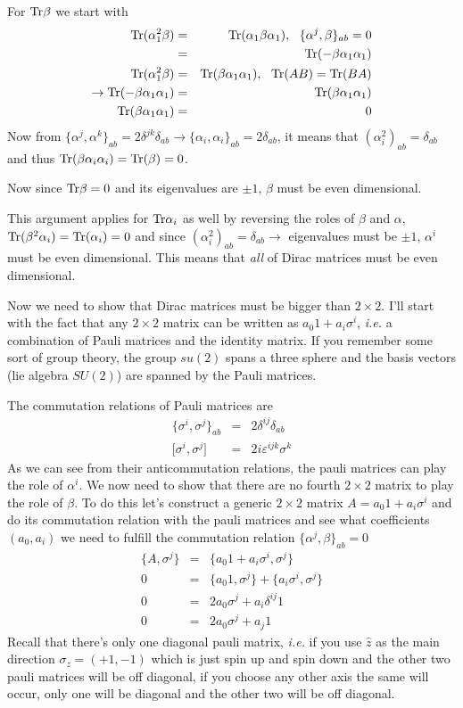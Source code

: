 \documentclass[aps,preprint,preprintnumbers,nofootinbib,showpacs,prd]{revtex4-1}
\newcommand{\ie}{{\it i.e.} }
\newcommand{\nbea}{\begin{eqnarray*}}
\newcommand{\neea}{\end{eqnarray*}}
\begin{document}
For ${\rm Tr} \beta$ we start with
%
\nbea
{\rm Tr} (\alpha_1^2 \beta) & = & {\rm Tr} (\alpha_1 \beta \alpha_1), ~~\{ \alpha^j, \beta\}_{ab} = 0 \\
& = & {\rm Tr} (-\beta \alpha_1 \alpha_1) \\
{\rm Tr} (\alpha_1^2 \beta) & = & {\rm Tr} (\beta  \alpha_1 \alpha_1), ~~{\rm Tr}(AB) = {\rm Tr}(BA) \\
\rightarrow {\rm Tr} (-\beta \alpha_1 \alpha_1) & = & {\rm Tr} (\beta \alpha_1 \alpha_1) \\
{\rm Tr} (\beta \alpha_1 \alpha_1) & = & 0
\neea
%
Now from $\{ \alpha^j, \alpha^k\}_{ab} = 2\delta^{jk}\delta_{ab} \rightarrow \{ \alpha_i, \alpha_i\}_{ab} = 2 \delta_{ab}$, it means that $(\alpha^2_i)_{ab} = \delta_{ab}$ and thus ${\rm Tr} (\beta \alpha_i \alpha_i) = {\rm Tr} (\beta) = 0$.

Now since ${\rm Tr} \beta = 0$ and its eigenvalues are $\pm 1$, $\beta$ must be even dimensional.

This argument applies for ${\rm Tr} \alpha_i$ as well by reversing the roles of $\beta$ and $\alpha$, ${\rm Tr} (\beta^2 \alpha_i) = {\rm Tr} (\alpha_i) = 0$ and since $(\alpha^2_i)_{ab} = \delta_{ab} \rightarrow$ eigenvalues must be $\pm 1$, $\alpha^i$ must be even dimensional. This means that {\it all} of Dirac matrices must be even dimensional.

Now we need to show that Dirac matrices must be bigger than $2 \times 2$. I'll start with the fact that any $2 \times 2$ matrix can be written as $ a_0 1 + a_i \sigma^i$, \ie a combination of Pauli matrices and the identity matrix. If you remember some sort of group theory, the group $su(2)$ spans a three sphere and the basis vectors (lie algebra $SU(2)$) are spanned by the Pauli matrices.

The commutation relations of Pauli matrices are
%
\nbea
\{\sigma^i, \sigma^j\}_{ab} & = & 2\delta^{ij} \delta_{ab} \\
\lbrack \sigma^i, \sigma^j \rbrack & = & 2 i \varepsilon^{ijk} \sigma^{k} 
\neea
%
As we can see from their anticommutation relations, the pauli matrices can play the role of $\alpha^i$. We now need to show that there are no fourth $2\times2$ matrix to play the role of $\beta$. To do this let's construct a generic $2\times2$ matrix $A = a_0 1 + a_i \sigma^i$ and do its commutation relation with the pauli matrices and see what coefficients $(a_0, a_i)$ we need to fulfill the commutation relation $\{ \alpha^j, \beta\}_{ab} = 0$
%
\nbea
\{A, \sigma^j\} & = & \{a_0 1 + a_i \sigma^i,  \sigma^j\} \\
0 & = & \{a_0 1,  \sigma^j\}  + \{a_i \sigma^i,  \sigma^j\} \\
0 & = & 2 a_0 \sigma^j + a_i \delta^{ij} 1 \\
0 & = & 2 a_0 \sigma^j + a_j 1
\neea
%
Recall that there's only one diagonal pauli matrix, \ie if you use $\hat z$ as the main direction $\sigma_z = (+1, -1)$ which is just spin up and spin down and the other two pauli matrices will be off diagonal, if you choose any other axis the same will occur, only one will be diagonal and the other two will be off diagonal.
\end{document}
